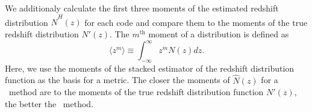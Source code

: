 We additionaly calculate the first three moments of the estimated redshift distribution $\hat{N}^{H}(z)$ for each code and compare them to the moments of the true redshift distribution $N'(z)$.
The $m^{\mathrm{th}}$ moment of a distribution is defined as
\begin{equation}
\langle z^{m}\rangle \equiv \int_{-\infty}^{\infty}z^{m}N(z)dz .
\end{equation}
Here, we use the moments of the stacked estimator of the redshift distribution function as the basis for a metric.
The closer the moments of $\hat{N}(z)$ for a \pzpdf\ method are to the moments of the true redshift distribution function $N'(z)$, the better the \pzpdf\ method.
